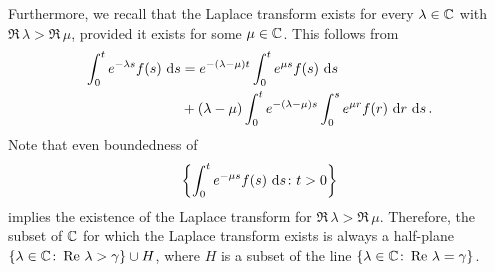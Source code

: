 Furthermore, we recall that the Laplace transform exists for every $\lambda \in \mathbb{C}$ with $\Re\,\lambda > \Re\,\mu$, provided it exists for some $\mu\in\mathbb{C}$.
This follows from 
\begin{align}\label{eq:a4-1.1}
\int_0^t e^{-\lambda s} f(s)\,\mathop{}\!\mathrm{d}{s} &= e^{-(\lambda-\mu)t} \int_{0}^{t} e^{\mu s} f(s) \,\mathop{}\!\mathrm{d}{s} \\ 
&+ (\lambda - \mu) \int_{0}^{t} e^{-(\lambda-\mu)s} \int_{0}^{s} e^{\mu r} f(r) \,\mathop{}\!\mathrm{d}{r}\,\mathop{}\!\mathrm{d}{s} \,. \notag
\end{align}
Note that even boundedness of 
\[
\left\{ \int_{0}^{t} e^{-\mu s}f(s) \,\mathop{}\!\mathrm{d}{s} \colon t > 0\right\}
\]
implies the existence of the Laplace transform for $\Re\,\lambda > \Re\,\mu$. 
Therefore, the subset of $\mathbb{C}$ for which the Laplace transform exists is always a half-plane 
$\{\lambda \in \mathbb{C}\colon\mathop{}\!\mathrm{Re}\,\,\lambda > \gamma\} \cup H$, where $H$ is a subset of the line $\{\lambda \in \mathbb{C}\colon\mathop{}\!\mathrm{Re}\,\,\lambda = \gamma\}$.

